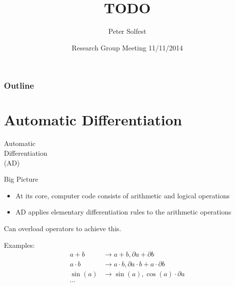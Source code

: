 \documentclass[12pt]{beamer}
\title[]
{
  TODO
}
\author{Peter Solfest}
\institute{University of Minnesota\\Department of Computer Science and Engineering}
\date{Research Group Meeting 11/11/2014}
\begin{document}
	\frame{\titlepage}

	\begin{frame}
		\frametitle{Outline}
		\tableofcontents
	\end{frame}
	

	\section{Automatic Differentiation}
	\begin{frame}{}
    \centering
    {\huge Automatic \\Differentiation \\(AD)}	
	\end{frame}	
	
	\begin{frame}{Big Picture}
    \begin{itemize}
      \item At its core, computer code consists of arithmetic and logical operations
      \item AD applies elementary differentiation rules to the arithmetic operations
    \end{itemize}
    \begin{center}
    Can overload operators to achieve this.
    
    Examples:
    \begin{align*}
      a + b &\to {a+b, \partial a + \partial b}\\
      a \cdot b &\to {a \cdot b, \partial a \cdot b + a \cdot \partial b}\\
      \sin(a) &\to {\sin(a) , \cos(a) \cdot \partial a}\\
      \cdots
    \end{align*}
    \end{center}
	\end{frame}
\end{document}
